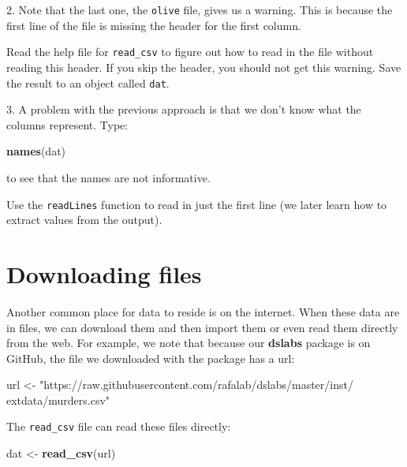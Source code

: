 \documentclass[
]{krantz}
\newenvironment{Shaded}{\begin{snugshade}}{\end{snugshade}}
\newcommand{\KeywordTok}[1]{\textcolor[rgb]{0.27,0.27,0.27}{\textbf{#1}}}
\newcommand{\NormalTok}[1]{#1}
\newcommand{\StringTok}[1]{\textcolor[rgb]{0.5,0.5,0.5}{#1}}
\begin{document}
2. Note that the last one, the \texttt{olive} file, gives us a warning. This is because the first line of the file is missing the header for the first column.

Read the help file for \texttt{read\_csv} to figure out how to read in the file without reading this header. If you skip the header, you should not get this warning. Save the result to an object called \texttt{dat}.

3. A problem with the previous approach is that we don't know what the columns represent. Type:

\begin{Shaded}
\begin{Highlighting}[]
\KeywordTok{names}\NormalTok{(dat)}
\end{Highlighting}
\end{Shaded}

to see that the names are not informative.

Use the \texttt{readLines} function to read in just the first line (we later learn how to extract values from the output).

\hypertarget{downloading-files}{%
\section{Downloading files}\label{downloading-files}}

Another common place for data to reside is on the internet. When these data are in files, we can download them and then import them or even read them directly from the web. For example, we note that because our \textbf{dslabs} package is on GitHub, the file we downloaded with the package has a url:

\begin{Shaded}
\begin{Highlighting}[]
\NormalTok{url <-}\StringTok{ "https://raw.githubusercontent.com/rafalab/dslabs/master/inst/}
\StringTok{extdata/murders.csv"}
\end{Highlighting}
\end{Shaded}

The \texttt{read\_csv} file can read these files directly:

\begin{Shaded}
\begin{Highlighting}[]
\NormalTok{dat <-}\StringTok{ }\KeywordTok{read_csv}\NormalTok{(url)}
\end{Highlighting}
\end{Shaded}
\end{document}
